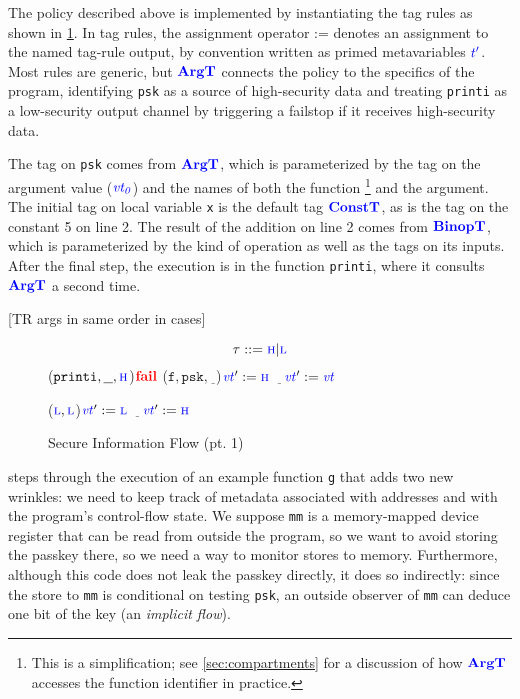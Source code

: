 \documentclass{llncs}
\begin{document}
The policy described above is implemented by instantiating the tag rules as shown in \cref{fig:example1rules}. In tag rules,
the assignment operator := denotes an assignment to the named tag-rule output, by convention
written as primed metavariables \(\gentag[']\).  Most rules are generic, but
\(\argtname\) connects the policy to the specifics of the program, identifying {\tt psk}
as a source of high-security data and treating {\tt printi} as a low-security output channel by
triggering a failstop if it receives high-security data.

The tag on {\tt psk} comes from \(\argtname\), which is parameterized by the tag on the argument
value (\(\vt[_0]\)) and the names of both the function
\footnote{This is a simplification; see \cref{sec:compartments} for a discussion of how \(\argtname\)
accesses the function identifier in practice.}
and the argument. The initial tag on local
variable {\tt x} is the default tag \(\consttname\), as is the tag on the constant 5 on line 2.
The result of the addition on line 2 comes from \(\binoptname\), which is parameterized
by the kind of operation as well as the tags on its inputs.
After the final step, the execution is in the function {\tt printi}, where it consults
\(\argtname\) a second time.

[TR args in same order in cases]

\begin{figure}
  \begin{minipage}{0.4\textwidth}
    \[\tau::=\high | \low\]
    \argtexruleblock
        {
          {(\(\mathtt{printi},\underline{~~},\high\))}{\(\fail\)}
          {(\(\mathtt{f},\mathtt{psk},\underline{~~}\))}{\(\vt':=\high\)}
          {\(\underline{~~~}\)}{\(\vt':=\vt\)}}
  \end{minipage}
  \begin{minipage}{0.5\textwidth}

    \binoptexruleblock
        {\caseoftwo{\((\vt[_1],\vt[_2])\)}
          {(\(\low,\low\))}{\(\vt':=\low\)}
          {\(\underline{~~~}\)}{\(\vt':=\high\)}}
  \end{minipage}

  \caption{Secure Information Flow (pt. 1)}
  \label{fig:example1rules}
\end{figure}

 steps through the execution of an example function {\tt g} that adds two new wrinkles: we need to keep track of metadata associated with
addresses and with the program's control-flow state. We suppose {\tt mm} is
a memory-mapped device register that can be read from outside the program, so we want to avoid storing the passkey there,
so we need a way to monitor stores to memory.  Furthermore, although this code does not leak the passkey directly,
it does so indirectly: since the store to {\tt mm} is conditional on testing {\tt psk},
an outside observer of {\tt mm} can deduce one bit of the key (an {\em implicit flow}).
\end{document}

